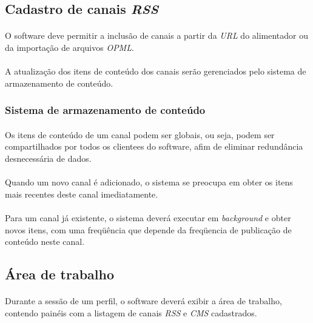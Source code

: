 \documentclass[a4paper,12pt]{article}
\def\cms{\emph{CMS}}
\def\rss{\emph{RSS}}
\begin{document}
\subsection{Cadastro de canais \rss{}}

\paragraph{}
O software deve permitir a inclusão de canais a partir da \emph{URL} do alimentador ou da importação de arquivos \emph{OPML}.
\paragraph{}
A atualização dos itens de conteúdo dos canais serão gerenciados pelo sistema de armazenamento de conteúdo.
\paragraph{}

\subsubsection{Sistema de armazenamento de conteúdo}

\paragraph{}
Os itens de conteúdo de um canal podem ser globais, ou seja, podem ser compartilhados por todos os clientees do software, afim de eliminar redundância desnecessária de dados.
\paragraph{}
Quando um novo canal é adicionado, o sistema se preocupa em obter os itens mais recentes deste canal imediatamente.
\paragraph{}
Para um canal já existente, o sistema deverá executar em \emph{background} e obter novos itens, com uma freqüência que depende da freqüencia de publicação de conteúdo neste canal.

\subsection{Área de trabalho}

\paragraph{}
Durante a sessão de um perfil, o software deverá exibir a área de trabalho, contendo painéis com a listagem de canais \rss{} e \cms{} cadastrados.
\end{document}
